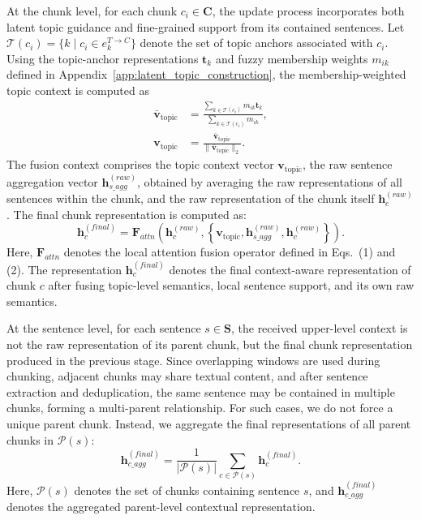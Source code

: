 \documentclass[a4paper,fleqn]{cas-dc}
\begin{document}
At the chunk level, for each chunk $c_i \in \mathbf{C}$, the update process incorporates both latent topic guidance and fine-grained support from its contained sentences. Let $\mathcal{T}(c_i)=\{k\mid c_i\in e_k^{T\rightarrow C}\}$ denote the set of topic anchors associated with $c_i$. Using the topic-anchor representations $\mathbf{t}_k$ and fuzzy membership weights $m_{ik}$ defined in Appendix~\ref{app:latent_topic_construction}, the membership-weighted topic context is computed as
\begin{equation}
\begin{aligned}
\bar{\mathbf{v}}_{\mathrm{topic}}
&=
\frac{\sum_{k\in\mathcal{T}(c_i)}m_{ik}\mathbf{t}_k}
{\sum_{k\in\mathcal{T}(c_i)}m_{ik}},\\
\mathbf{v}_{\mathrm{topic}}
&=
\frac{\bar{\mathbf{v}}_{\mathrm{topic}}}
{\|\bar{\mathbf{v}}_{\mathrm{topic}}\|_2}.
\end{aligned}
\end{equation}
The fusion context comprises the topic context vector $\mathbf{v}_{\mathrm{topic}}$, the raw sentence aggregation vector $\mathbf{h}_{s\_agg}^{(raw)}$, obtained by averaging the raw representations of all sentences within the chunk, and the raw representation of the chunk itself $\mathbf{h}_{c}^{(raw)}$. The final chunk representation is computed as:
\begin{equation}
\mathbf{h}_{c}^{(final)}
=
\mathbf{F}_{attn}
\left(
\mathbf{h}_{c}^{(raw)},
\left\{
\mathbf{v}_{\mathrm{topic}},
\mathbf{h}_{s\_agg}^{(raw)},
\mathbf{h}_{c}^{(raw)}
\right\}
\right).
\end{equation}
Here, $\mathbf{F}_{attn}$ denotes the local attention fusion operator defined in Eqs.~(1) and (2).
The representation $\mathbf{h}_{c}^{(final)}$ denotes the final context-aware representation of chunk $c$ after fusing topic-level semantics, local sentence support, and its own raw semantics.

At the sentence level, for each sentence $s \in \mathbf{S}$, the received upper-level context is not the raw representation of its parent chunk, but the final chunk representation produced in the previous stage. Since overlapping windows are used during chunking, adjacent chunks may share textual content, and after sentence extraction and deduplication, the same sentence may be contained in multiple chunks, forming a multi-parent relationship. For such cases, we do not force a unique parent chunk. Instead, we aggregate the final representations of all parent chunks in $\mathcal{P}(s)$:
\begin{equation}
\mathbf{h}_{c\_agg}^{(final)}
=
\frac{1}{|\mathcal{P}(s)|}
\sum_{c \in \mathcal{P}(s)}
\mathbf{h}_{c}^{(final)}.
\end{equation}
Here, $\mathcal{P}(s)$ denotes the set of chunks containing sentence $s$, and $\mathbf{h}_{c\_agg}^{(final)}$ denotes the aggregated parent-level contextual representation.
\end{document}
